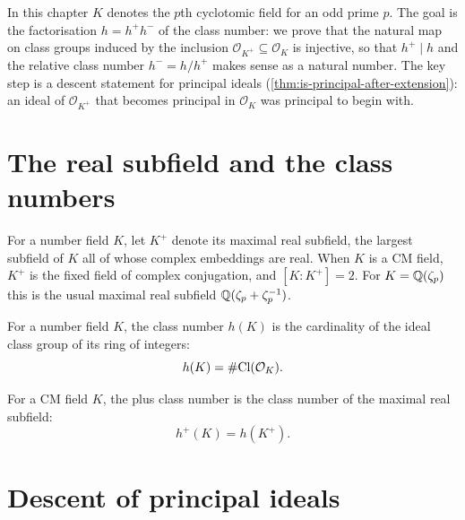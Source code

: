 
In this chapter $K$ denotes the $p$th cyclotomic field for an odd prime
$p$.  The goal is the factorisation $h = h^+ h^-$ of the class number: we
prove that the natural map on class groups induced by the inclusion
$\mathcal O_{K^+} \subseteq \mathcal O_K$ is injective, so that $h^+ \mid
h$ and the relative class number $h^- = h/h^+$ makes sense as a natural
number.  The key step is a descent statement for principal ideals
(\cref{thm:is-principal-after-extension}): an ideal of $\mathcal O_{K^+}$
that becomes principal in $\mathcal O_K$ was principal to begin with.

\section{The real subfield and the class numbers}

\begin{definition}\label{def:cm-real-subfield}
  \leanok
For a number field $K$, let $K^+$ denote its maximal real subfield, the
largest subfield of $K$ all of whose complex embeddings are real.  When $K$
is a CM field, $K^+$ is the fixed field of complex conjugation, and
$[K : K^+] = 2$.  For $K = \mathbb{Q}(\zeta_p)$ this is the usual maximal real
subfield $\mathbb{Q}(\zeta_p + \zeta_p^{-1})$.
\end{definition}

\begin{definition}\label{def:class-number-h}
  \leanok
For a number field $K$, the class number $h(K)$ is the cardinality of the
ideal class group of its ring of integers:
\[
  h(K)=\#\mathrm{Cl}(\mathcal O_K).
\]
\end{definition}

\begin{definition}\label{def:class-number-hplus}
  \leanok
For a CM field $K$, the plus class number is the class number of the
maximal real subfield:
\[
  h^+(K)=h(K^+).
\]
\end{definition}

\section{Descent of principal ideals}

